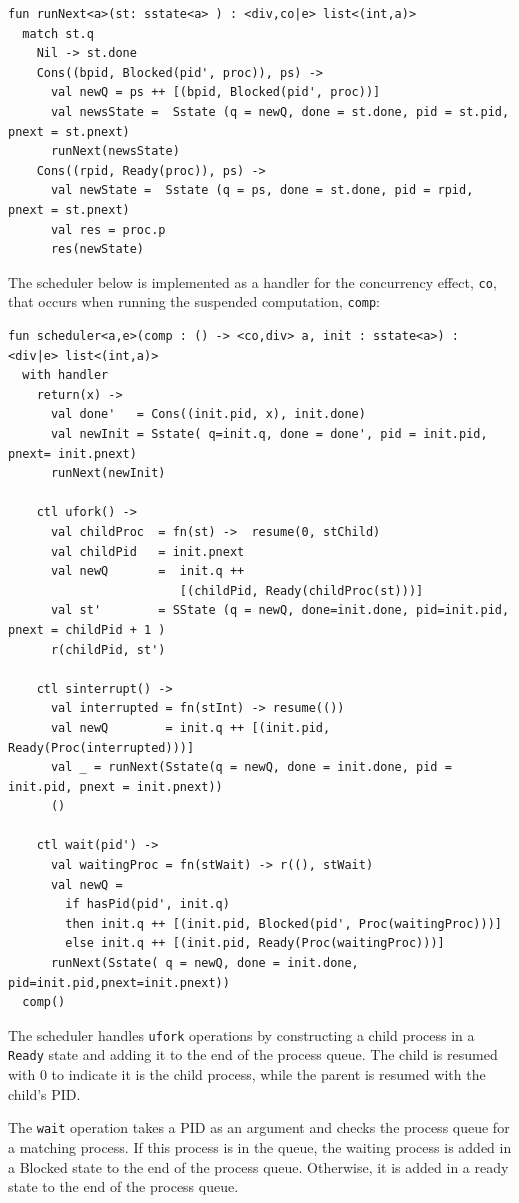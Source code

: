\documentclass[logo,bsc,singlespacing,parskip]{infthesis}
\begin{document}
\begin{lstlisting}
fun runNext<a>(st: sstate<a> ) : <div,co|e> list<(int,a)> 
  match st.q
    Nil -> st.done
    Cons((bpid, Blocked(pid', proc)), ps) -> 
      val newQ = ps ++ [(bpid, Blocked(pid', proc))]
      val newsState =  Sstate (q = newQ, done = st.done, pid = st.pid, pnext = st.pnext)
      runNext(newsState) 
    Cons((rpid, Ready(proc)), ps) -> 
      val newState =  Sstate (q = ps, done = st.done, pid = rpid, pnext = st.pnext)
      val res = proc.p
      res(newState)
\end{lstlisting}

The scheduler below is implemented as a handler for the concurrency effect, \lstinline{co}, that occurs when running the suspended computation, \lstinline{comp}: 


\begin{lstlisting}
fun scheduler<a,e>(comp : () -> <co,div> a, init : sstate<a>) : <div|e> list<(int,a)>
  with handler
    return(x) -> 
      val done'   = Cons((init.pid, x), init.done)
      val newInit = Sstate( q=init.q, done = done', pid = init.pid, pnext= init.pnext)
      runNext(newInit)

    ctl ufork() -> 
      val childProc  = fn(st) ->  resume(0, stChild)  
      val childPid   = init.pnext
      val newQ       =  init.q ++ 
                        [(childPid, Ready(childProc(st)))]
      val st'        = SState (q = newQ, done=init.done, pid=init.pid, pnext = childPid + 1 )
      r(childPid, st')

    ctl sinterrupt() ->
      val interrupted = fn(stInt) -> resume(())
      val newQ        = init.q ++ [(init.pid, Ready(Proc(interrupted)))]
      val _ = runNext(Sstate(q = newQ, done = init.done, pid = init.pid, pnext = init.pnext))
      ()

    ctl wait(pid') ->
      val waitingProc = fn(stWait) -> r((), stWait)
      val newQ =
        if hasPid(pid', init.q)
        then init.q ++ [(init.pid, Blocked(pid', Proc(waitingProc)))]
        else init.q ++ [(init.pid, Ready(Proc(waitingProc)))]
      runNext(Sstate( q = newQ, done = init.done, pid=init.pid,pnext=init.pnext))      
  comp()
\end{lstlisting}    
The scheduler handles \lstinline{ufork} operations by constructing a child process in a \lstinline{Ready} state and adding it to the end of the process queue. The child is resumed with 0 to indicate it is the child process, while the parent is resumed with the child's PID.

The \lstinline{wait} operation takes a PID as an argument and checks the process queue for a matching process. If this process is in the queue, the waiting process is added in a Blocked state to the end of the process queue. Otherwise, it is added in a ready state to the end of the process queue.
\end{document}
